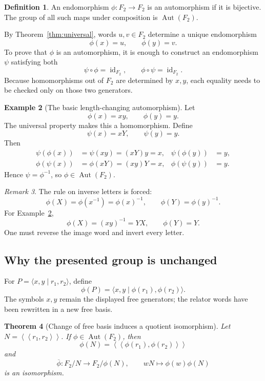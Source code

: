 \documentclass[11pt]{article}
\newtheorem{theorem}{Theorem}[section]
\theoremstyle{definition}
\newtheorem{definition}[theorem]{Definition}
\newtheorem{example}[theorem]{Example}
\theoremstyle{remark}
\newtheorem{remark}[theorem]{Remark}
\newcommand{\F}{F_2}
\newcommand{\Aut}{\operatorname{Aut}}
\newcommand{\Ncl}[1]{\left\langle\!\left\langle #1\right\rangle\!\right\rangle}
\newcommand{\id}{\operatorname{id}}
\begin{document}
\begin{definition}
An endomorphism \(\phi:\F\to\F\) is an automorphism if it is bijective.
The group of all such maps under composition is \(\Aut(\F)\).
\end{definition}

By Theorem~\ref{thm:universal}, words \(u,v\in\F\) determine a unique
endomorphism
\[
  \phi(x)=u,\qquad \phi(y)=v.
\]
To prove that \(\phi\) is an automorphism, it is enough to construct an
endomorphism \(\psi\) satisfying both
\[
  \psi\circ\phi=\id_{\F},
  \qquad
  \phi\circ\psi=\id_{\F}.
\]
Because homomorphisms out of \(\F\) are determined by \(x,y\), each equality
needs to be checked only on those two generators.

\begin{example}[The basic length-changing automorphism]
\label{ex:basic-aut}
Let
\[
  \phi(x)=xy,\qquad \phi(y)=y.
\]
The universal property makes this a homomorphism.  Define
\[
  \psi(x)=xY,\qquad \psi(y)=y.
\]
Then
\begin{align*}
\psi(\phi(x))&=\psi(xy)=(xY)y=x,&
\psi(\phi(y))&=y,\\
\phi(\psi(x))&=\phi(xY)=(xy)Y=x,&
\phi(\psi(y))&=y.
\end{align*}
Hence \(\psi=\phi^{-1}\), so \(\phi\in\Aut(\F)\).
\end{example}

\begin{remark}
The rule on inverse letters is forced:
\[
  \phi(X)=\phi(x^{-1})=\phi(x)^{-1},\qquad
  \phi(Y)=\phi(y)^{-1}.
\]
For Example~\ref{ex:basic-aut},
\[
  \phi(X)=(xy)^{-1}=YX,\qquad \phi(Y)=Y.
\]
One must reverse the image word and invert every letter.
\end{remark}

\subsection{Why the presented group is unchanged}

For \(P=\langle x,y\mid r_1,r_2\rangle\), define
\[
  \phi(P)=\langle x,y\mid\phi(r_1),\phi(r_2)\rangle.
\]
The symbols \(x,y\) remain the displayed free generators; the relator words
have been rewritten in a new free basis.

\begin{theorem}[Change of free basis induces a quotient isomorphism]
\label{thm:quotient-iso}
Let \(N=\Ncl{r_1,r_2}\).  If \(\phi\in\Aut(\F)\), then
\[
  \phi(N)=\Ncl{\phi(r_1),\phi(r_2)}
\]
and
\[
  \overline{\phi}:\F/N\longrightarrow \F/\phi(N),
  \qquad
  wN\longmapsto\phi(w)\phi(N)
\]
is an isomorphism.
\end{theorem}
\end{document}
